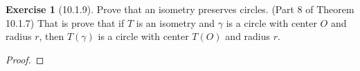 \documentclass[11pt]{article}		%
\theoremstyle{definition}
\newtheorem*{ex}{Exercise}
\begin{document}
\vspace{1in} %





\begin{ex}[10.1.9]
	Prove that an isometry preserves circles. (Part 8 of Theorem 10.1.7)  That is prove that if $T$ is an isometry and $\gamma$ is a circle with center $O$ and radius $r$, then $T(\gamma)$ is a circle with center $T(O)$ and radius $r$.
	
\end{ex}

\begin{proof} 
	
\end{proof}
\end{document}
